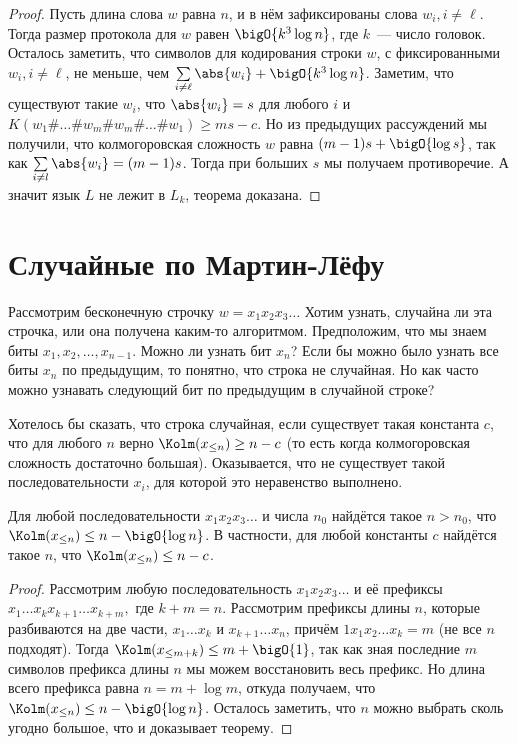 \begin{proof}
    Пусть длина слова $w$ равна $n$, и в нём зафиксированы слова $w_i, i \neq {\ell}$. Тогда размер
    протокола для $w$ равен $\bigO{k^3 \log n}$, где $k$~--- число головок. Осталось заметить, что 
    символов для кодирования строки $w$, с фиксированными $w_i, i \neq {\ell}$, не меньше, чем
    $\sum\limits_{i \neq \ell}{\abs{w_i}} + \bigO{k^3 \log n}$. Заметим, что существуют такие $w_i$, что
    $\abs{w_i} = s$ для любого $i$ и $K(w_1\#\ldots\#w_m\#w_m\#\ldots\#w_1) \geq ms - c$. Но из
    предыдущих рассуждений мы получили, что колмогоровская сложность $w$ равна $(m - 1)s +
    \bigO{\log s}$, так как $\sum\limits_{i \neq l} {\abs{w_i}} = (m - 1)s$. Тогда при больших $s$ мы
    получаем противоречие. А значит язык $L$ не лежит в $L_k$, теорема доказана.    
\end{proof}


\section{Случайные по Мартин-Лёфу}

Рассмотрим бесконечную строчку $w = x_1x_2x_3\ldots $ Хотим узнать, случайна ли эта строчка, или она
получена каким-то алгоритмом. Предположим, что мы знаем биты $x_1, x_2, \ldots, x_{n - 1}$. Можно ли узнать
бит $x_n$? Если бы можно было узнать все биты $x_n$ по предыдущим, то понятно, что строка не
случайная. Но как часто можно узнавать следующий бит по предыдущим в случайной строке? 

Хотелось бы сказать, что строка случайная, если существует такая константа $c$, что для любого $n$ верно
$\Kolm(x_{\leq n}) \geq n - c$ (то есть когда колмогоровская сложность достаточно большая). Оказывается,
что не существует такой последовательности $x_i$, для которой это неравенство выполнено.
\begin{theorem}
   Для любой последовательности $x_1x_2x_3\ldots$ и числа $n_0$ найдётся такое $n > n_0$, что
   $\Kolm(x_{\leq n}) \le n - \bigO{\log n}$. В частности, для любой константы $c$ найдётся такое $n$,
   что $\Kolm(x_{\leq n}) \le n - c$. 
\end{theorem}

\begin{proof}
    Рассмотрим любую последовательность $x_1x_2x_3\ldots$ и её префиксы $x_1\ldots x_kx_{k + 1}\ldots
    x_{k + m}, $ где $k + m = n$. Рассмотрим префиксы длины $n$, которые разбиваются на две части,
    $x_1\ldots x_k$ и $x_{k + 1} \ldots x_n$, причём $1x_1x_2\ldots x_k = m$ (не все $n$ подходят). Тогда
    $\Kolm(x_{\leq m + k}) \leq m + \bigO{1}$, так как зная последние $m$ символов префикса длины $n$ мы можем
    восстановить весь префикс. Но длина всего префикса равна $n = m + \log m$, откуда получаем, что
    $\Kolm(x_{\leq n}) \leq n - \bigO{\log n}$. Осталось заметить, что $n$ можно выбрать сколь угодно большое,
    что и доказывает теорему.
\end{proof}


